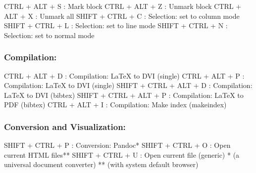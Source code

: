\vspace{-0.5cm}
\begin{Rtables}[caption={[Selection keyboard shortcuts]
    Selection keyboard shortcuts},
  label=hotkey:selection]
  CTRL  + ALT  + S : Mark block
  CTRL  + ALT  + Z : Unmark block
  CTRL  + ALT  + X : Unmark all
  SHIFT + CTRL + C : Selection: set to column mode
  SHIFT + CTRL + L : Selection: set to line mode
  SHIFT + CTRL + N : Selection: set to normal mode
\end{Rtables}


\subsubsection{Compilation:}

\vspace{-0.5cm}
\begin{Rtables}[caption={[Compilation keyboard shortcuts]
    Compilation keyboard shortcuts},
  label=hotkey:compilation]
  CTRL  + ALT  + D       : Compilation: LaTeX to DVI (single)
  CTRL  + ALT  + P       : Compilation: LaTeX to DVI (single)
  SHIFT + CTRL + ALT + D : Compilation: LaTeX to DVI (bibtex)
  SHIFT + CTRL + ALT + P : Compilation: LaTeX to PDF (bibtex)
  CTRL  + ALT  + I       : Compilation: Make index (makeindex)
\end{Rtables}


\subsubsection{Conversion and Visualization:}

\vspace{-0.5cm}
\begin{Rtables}[caption={[Conversion and visualization keyboard shortcuts]
    Conversion and visualization keyboard shortcuts},
  label=hotkey:conversion]
  SHIFT + CTRL + P : Conversion: Pandoc*
  SHIFT + CTRL + O : Open current HTML files**
  SHIFT + CTRL + U : Open current file (generic)
  *  (a universal document converter)
  ** (with system default browser)
\end{Rtables}


